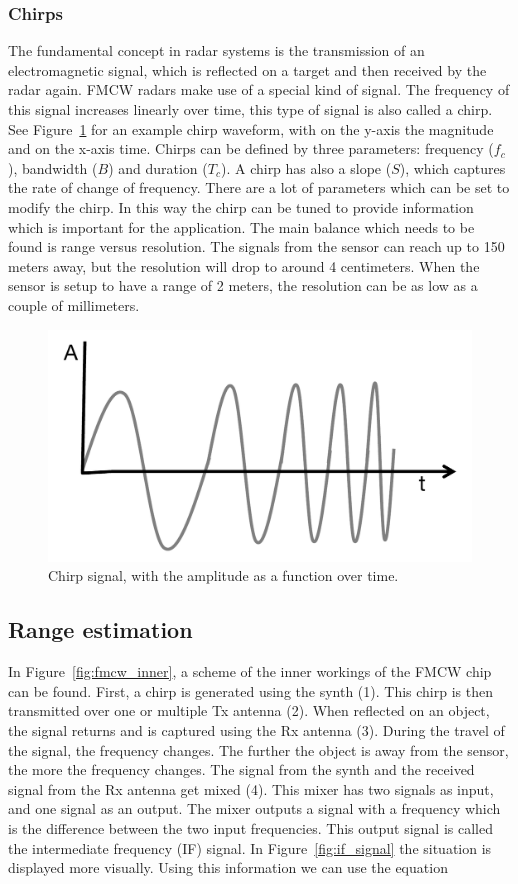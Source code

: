\subsubsection{Chirps}
The fundamental concept in radar systems is the transmission of an electromagnetic signal, which is reflected on a target and then received by the radar again. FMCW radars make use of a special kind of signal. The frequency of this signal increases linearly over time, this type of signal is also called a chirp. See Figure~\ref{fig:chirp} for an example chirp waveform, with on the y-axis the magnitude and on the x-axis time. Chirps can be defined by three parameters: frequency ($f_c$), bandwidth ($B$) and duration ($T_c$). A chirp has also a slope ($S$), which captures the rate of change of frequency. There are a lot of parameters which can be set to modify the chirp. In this way the chirp can be tuned to provide information which is important for the application. The main balance which needs to be found is range versus resolution. The signals from the sensor can reach up to 150 meters away, but the resolution will drop to around 4 centimeters. When the sensor is setup to have a range of 2 meters, the resolution can be as low as a couple of millimeters.

\begin{figure}[t]
\centering
\includegraphics[width=.5\textwidth]{figures/chirp.png}
\caption{Chirp signal, with the amplitude as a function over time.}
\label{fig:chirp}
\end{figure}

\subsection{Range estimation}
In Figure~\ref{fig:fmcw_inner}, a scheme of the inner workings of the FMCW chip can be found. First, a chirp is generated using the synth (1). This chirp is then transmitted over one or multiple Tx antenna (2). When reflected on an object, the signal returns and is captured using the Rx antenna (3). During the travel of the signal, the frequency changes. The further the object is away from the sensor, the more the frequency changes. The signal from the synth and the received signal from the Rx antenna get mixed (4). This mixer has two signals as input, and one signal as an output. The mixer outputs a signal with a frequency which is the difference between the two input frequencies. This output signal is called the intermediate frequency (IF) signal. In Figure~\ref{fig:if_signal} the situation is displayed more visually. Using this information we can use the equation


